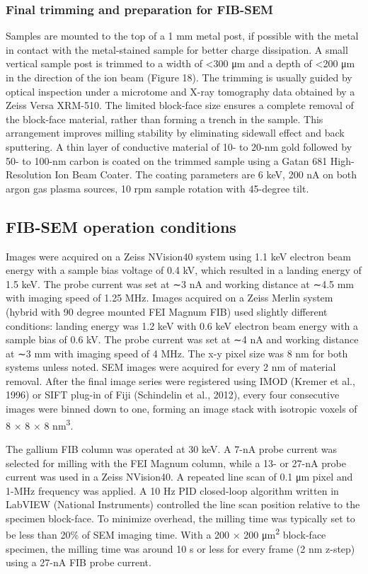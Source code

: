 \documentclass{article}
\begin{document}
\subsubsection*{Final trimming and preparation for FIB-SEM}

Samples are mounted to the top of a 1 mm metal post, if possible with the metal in contact with the metal-stained sample for better charge dissipation. A small vertical sample post is trimmed to a width of <300 μm and a depth of <200 μm in the direction of the ion beam (Figure 18). The trimming is usually guided by optical inspection under a microtome and X-ray tomography data obtained by a Zeiss Versa XRM-510. The limited block-face size ensures a complete removal of the block-face material, rather than forming a trench in the sample. This arrangement improves milling stability by eliminating sidewall effect and back sputtering. A thin layer of conductive material of 10- to 20-nm gold followed by 50- to 100-nm carbon is coated on the trimmed sample using a Gatan 681 High-Resolution Ion Beam Coater. The coating parameters are 6 keV, 200 nA on both argon gas plasma sources, 10 rpm sample rotation with 45-degree tilt.

\subsection*{FIB-SEM operation conditions}

Images were acquired on a Zeiss NVision40 system using 1.1 keV electron beam energy with a sample bias voltage of 0.4 kV, which resulted in a landing energy of 1.5 keV. The probe current was set at ∼3 nA and working distance at ∼4.5 mm with imaging speed of 1.25 MHz. Images acquired on a Zeiss Merlin system (hybrid with 90 degree mounted FEI Magnum FIB) used slightly different conditions: landing energy was 1.2 keV with 0.6 keV electron beam energy with a sample bias of 0.6 kV. The probe current was set at ∼4 nA and working distance at ∼3 mm with imaging speed of 4 MHz. The x-y pixel size was 8 nm for both systems unless noted. SEM images were acquired for every 2 nm of material removal. After the final image series were registered using IMOD (Kremer et al., 1996) or SIFT plug-in of Fiji (Schindelin et al., 2012), every four consecutive images were binned down to one, forming an image stack with isotropic voxels of 8 × 8 × 8 nm\textsuperscript{3}.

The gallium FIB column was operated at 30 keV. A 7-nA probe current was selected for milling with the FEI Magnum column, while a 13- or 27-nA probe current was used in a Zeiss NVision40. A repeated line scan of 0.1 μm pixel and 1-MHz frequency was applied. A 10 Hz PID closed-loop algorithm written in LabVIEW (National Instruments) controlled the line scan position relative to the specimen block-face. To minimize overhead, the milling time was typically set to be less than 20\% of SEM imaging time. With a 200 × 200 μm\textsuperscript{2} block-face specimen, the milling time was around 10 s or less for every frame (2 nm z-step) using a 27-nA FIB probe current.
\end{document}

